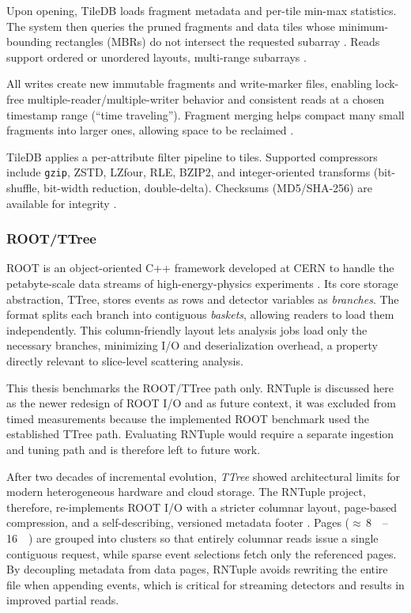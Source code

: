 \documentclass[nomenclature, english, bibtex]{kththesis}
\numberwithin{listing}{chapter}
\begin{document}
Upon opening, TileDB loads fragment metadata and per-tile min-max statistics. The system then queries the pruned fragments and data tiles whose minimum-bounding rectangles (MBRs) do not intersect the requested subarray \cite{TileDBFragmentMeta,TileDBMBR}. Reads support ordered or unordered layouts, multi-range subarrays \cite{TileDBReadLayouts}.

All writes create new immutable fragments and write-marker files, enabling lock-free multiple-reader/multiple-writer behavior and consistent reads at a chosen timestamp range (“time traveling”). Fragment merging helps compact many small fragments into larger ones, allowing space to be reclaimed \cite{TileDBTimeTravel}.

TileDB applies a per-attribute filter pipeline to tiles. Supported compressors include \texttt{gzip}, \gls{ZSTD}, \gls{LZfour}, RLE, BZIP2, and integer-oriented transforms (bit-shuffle, bit-width reduction, double-delta). Checksums (MD5/SHA-256) are available for integrity \cite{TileDBCompression,TileDBChecksums,TileDBEncryption}.

\subsubsection{\texorpdfstring{\gls{ROOT}/\gls{TTree}}{ROOT/TTree}}
\label{sec:root-rntuple}
\gls{ROOT} is an object-oriented C++ framework developed at \gls{CERN} to handle the petabyte-scale data streams of high-energy-physics experiments \cite{blomer2020evolution}. Its core storage abstraction, \gls{TTree}, stores events as rows and detector variables as \emph{branches}. The format splits each branch into contiguous \emph{baskets}, allowing readers to load them independently. This column-friendly layout lets analysis jobs load only the necessary branches, minimizing I/O and deserialization overhead, a property directly relevant to slice-level scattering analysis.

This thesis benchmarks the \gls{ROOT}/\gls{TTree} path only. \gls{RNTuple} is discussed here as the newer redesign of \gls{ROOT} I/O and as future context, it was excluded from timed measurements because the implemented \gls{ROOT} benchmark used the established \gls{TTree} path. Evaluating RNTuple would require a separate ingestion and tuning path and is therefore left to future work.

After two decades of incremental evolution, \emph{\gls{TTree}} showed architectural limits for modern heterogeneous hardware and cloud storage. The \gls{RNTuple} project, therefore, re-implements \gls{ROOT} I/O with a stricter columnar layout, page-based compression, and a self-describing, versioned metadata footer \cite{blomer2020evolution}. Pages (\(\approx\)\,\SIrange{8}{16}{\kilo\byte}) are grouped into clusters so that entirely columnar reads issue a single contiguous request, while sparse event selections fetch only the referenced pages. By decoupling metadata from data pages, \gls{RNTuple} avoids rewriting the entire file when appending events, which is critical for streaming detectors and results in improved partial reads.
\end{document}
